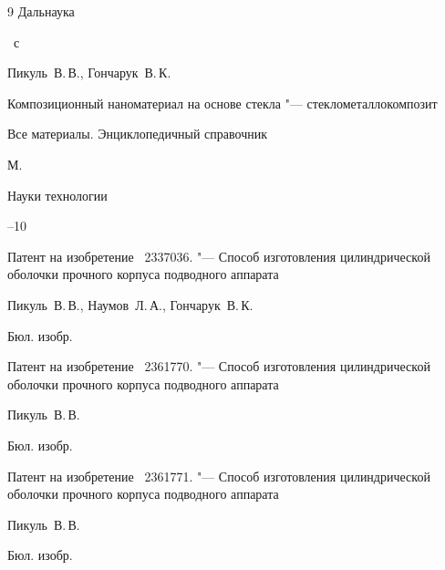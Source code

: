 \begin{thebibliography}{9}
\publ Дальнаука


~с






\by Пикуль~В.\,В., Гончарук~В.\,К. 

\paper Композиционный наноматериал на основе стекла "--- стеклометаллокомпозит 

\inbook Все материалы. Энциклопедичный справочник

\publaddr М.

\publ Науки технологии



--10




\paper Патент на изобретение \No~2337036. "--- Способ изготовления цилиндрической оболочки прочного корпуса подводного аппарата

\by Пикуль~В.\,В., Наумов~Л.\,А., Гончарук~В.\,К.

\jour Бюл. изобр.








\paper Патент на изобретение \No~2361770. "--- Способ изготовления цилиндрической оболочки прочного корпуса подводного аппарата

\by Пикуль~В.\,В. 

\jour Бюл. изобр. 






\paper  Патент на изобретение \No~2361771. "--- Способ изготовления цилиндрической оболочки прочного корпуса подводного аппарата

\by Пикуль~В.\,В.

\jour Бюл. изобр. 



\end{thebibliography}





\vspace{-12mm}



\makeengtitle







%

